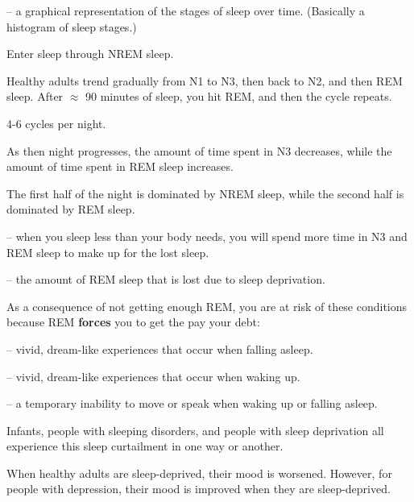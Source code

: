 \begin{coloredlist}
    \item {} -- a graphical representation of the stages of sleep over time. (Basically a histogram of sleep stages.)
    \item Enter sleep through NREM sleep.
    \item Healthy adults trend gradually from N1 to N3, then back to N2, and then REM sleep. After \(\approx\) 90 minutes of sleep, you hit REM, and then the cycle repeats.
    \item 4-6 cycles per night.
    \item As then night progresses, the amount of time spent in N3 decreases, while the amount of time spent in REM sleep increases.
    \item The first half of the night is dominated by NREM sleep, while the second half is dominated by REM sleep.
    \item {} -- when you sleep less than your body needs, you will spend more time in N3 and REM sleep to make up for the lost sleep.
    \begin{coloredlist}
        \item {} -- the amount of REM sleep that is lost due to sleep deprivation.
        \item As a consequence of not getting enough REM, you are at risk of these conditions because REM \textbf{forces} you to get the pay your debt:
        \begin{coloredlist}
            \item {} -- vivid, dream-like experiences that occur when falling asleep.
            \item {} -- vivid, dream-like experiences that occur when waking up.
            \item {} -- a temporary inability to move or speak when waking up or falling asleep.
        \end{coloredlist}
    \end{coloredlist}
    \item Infants, people with sleeping disorders, and people with sleep deprivation all experience this sleep curtailment in one way or another.
    \item When healthy adults are sleep-deprived, their mood is worsened. However, for people with depression, their mood is improved when they are sleep-deprived. 
    \begin{coloredlist}

\end{coloredlist}
\end{coloredlist}
